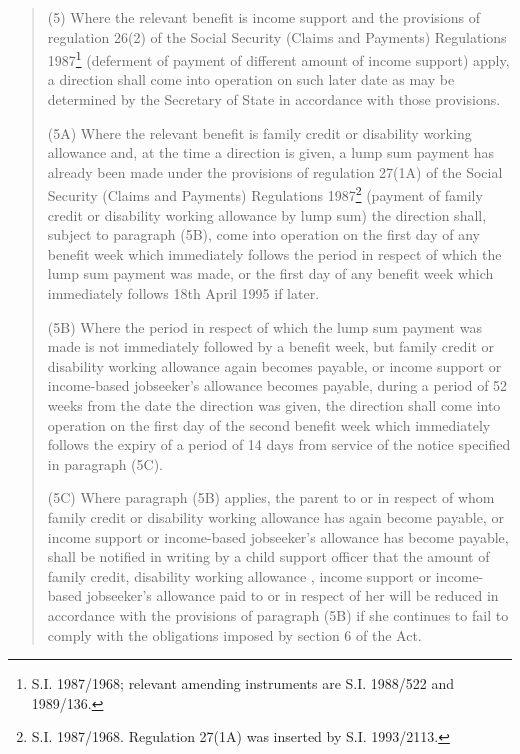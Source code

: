 \documentclass[a4paper]{article}
\begin{document}
{\begin{quotation}
(5) Where the relevant benefit is income support and the provisions of regulation 26(2) of the Social Security (Claims and Payments) Regulations 1987\footnote{\frenchspacing S.I. 1987/1968; relevant amending instruments are S.I. 1988/522 and 1989/136.} (deferment of payment of different amount of income support) apply, a direction shall come into operation on such later date as may be determined by the Secretary of State in accordance with those provisions.

(5A) Where the relevant benefit is family credit or disability working allowance and, at the time a direction is given, a lump sum payment has already been made under the provisions of regulation 27(1A) of the Social Security (Claims and Payments) Regulations 1987\footnote{\frenchspacing S.I. 1987/1968. Regulation 27(1A) was inserted by S.I. 1993/2113.} (payment of family credit or disability working allowance by lump sum) the direction shall, subject to paragraph (5B), come into operation on the first day of any benefit week which immediately follows the period in respect of which the lump sum payment was made, or the first day of any benefit week which immediately follows 18th April 1995 if later.

(5B) Where the period in respect of which the lump sum payment was made is not immediately followed by a benefit week, but family credit or disability working allowance again becomes payable, or income support 
or income-based jobseeker’s allowance  %
becomes payable, during a period of 52 weeks from the date the direction was given, the direction shall come into operation on the first day of the second benefit week which immediately follows the expiry of a period of 14 days from service of the notice specified in paragraph (5C).

(5C) Where paragraph (5B) applies, the parent to or in respect of whom family credit or disability working allowance has again become payable, or income support 
or income-based jobseeker’s allowance  %
has become payable, shall be notified in writing by a child support officer that the amount of family credit, disability working allowance%
, income support or income-based jobseeker’s allowance  %
paid to or in respect of her will be reduced in accordance with the provisions of paragraph (5B) if she continues to fail to comply with the obligations imposed by section 6 of the Act.


\end{quotation}}
\end{document}
